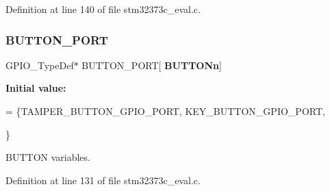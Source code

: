 Definition at line 140 of file stm32373c\+\_\+eval.\+c.

\mbox{\label{group___private___variables_gad63ed42b4071e78f80f7462227da4f35}} 
\subsubsection{B\+U\+T\+T\+O\+N\+\_\+\+P\+O\+RT}
{\footnotesize\ttfamily G\+P\+I\+O\+\_\+\+Type\+Def$\ast$ B\+U\+T\+T\+O\+N\+\_\+\+P\+O\+RT[\textbf{ B\+U\+T\+T\+O\+Nn}]}

{\bfseries Initial value\+:}
\begin{DoxyCode}
= \{TAMPER_BUTTON_GPIO_PORT,
                                      KEY_BUTTON_GPIO_PORT,





                                      \}
\end{DoxyCode}


B\+U\+T\+T\+ON variables. 



Definition at line 131 of file stm32373c\+\_\+eval.\+c.

